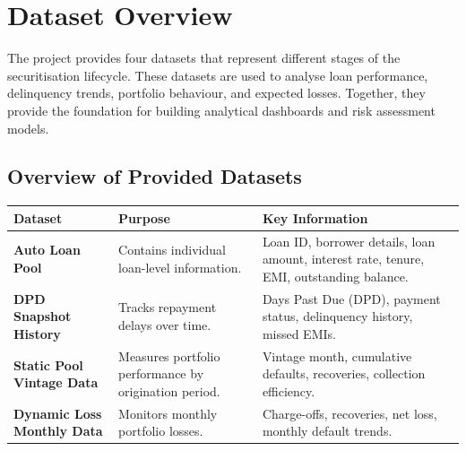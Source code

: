 
\section{Dataset Overview}

The project provides four datasets that represent different stages of the securitisation lifecycle. These datasets are used to analyse loan performance, delinquency trends, portfolio behaviour, and expected losses. Together, they provide the foundation for building analytical dashboards and risk assessment models.

\vspace{0.4cm}

\subsection*{Overview of Provided Datasets}

\renewcommand{\arraystretch}{1.5}

\begin{tabularx}{\textwidth}{|p{4cm}|X|X|}
	\hline
	\rowcolor{TableHeader}
	\textbf{Dataset} & \textbf{Purpose} & \textbf{Key Information} \\
	\hline
	
	\textbf{Auto Loan Pool}
	&
	Contains individual loan-level information.
	&
	Loan ID, borrower details, loan amount, interest rate, tenure, EMI, outstanding balance.
	\\
	\hline
	
	\textbf{DPD Snapshot History}
	&
	Tracks repayment delays over time.
	&
	Days Past Due (DPD), payment status, delinquency history, missed EMIs.
	\\
	\hline
	
	\textbf{Static Pool Vintage Data}
	&
	Measures portfolio performance by origination period.
	&
	Vintage month, cumulative defaults, recoveries, collection efficiency.
	\\
	\hline
	
	\textbf{Dynamic Loss Monthly Data}
	&
	Monitors monthly portfolio losses.
	&
	Charge-offs, recoveries, net loss, monthly default trends.
	\\
	\hline
	
\end{tabularx}

\vspace{0.6cm}

